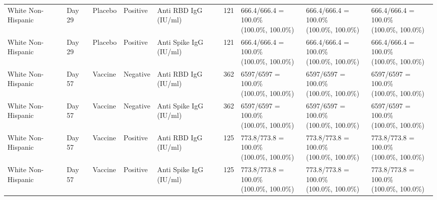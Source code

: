 \documentclass[]{book}
\theoremstyle{definition}
\theoremstyle{definition}
\theoremstyle{definition}
\newcommand{\1}{\mathbbm{1}}
\begin{document}
\begin{landscape}
\begin{ThreePartTable}
\begin{longtable}[t]{>{\raggedright\arraybackslash}p{2.7cm}llllllll}
\hspace{1em}White Non-Hispanic & Day 29 & Placebo & Positive & Anti RBD IgG (IU/ml) & 121 & \makecell[l]{666.4/666.4 = 100.0\%\\(100.0\%, 100.0\%)} & \makecell[l]{666.4/666.4 = 100.0\%\\(100.0\%, 100.0\%)} & \makecell[l]{666.4/666.4 = 100.0\%\\(100.0\%, 100.0\%)}\\
\hspace{1em}White Non-Hispanic & Day 29 & Placebo & Positive & Anti Spike IgG (IU/ml) & 121 & \makecell[l]{666.4/666.4 = 100.0\%\\(100.0\%, 100.0\%)} & \makecell[l]{666.4/666.4 = 100.0\%\\(100.0\%, 100.0\%)} & \makecell[l]{666.4/666.4 = 100.0\%\\(100.0\%, 100.0\%)}\\
\hspace{1em}White Non-Hispanic & Day 57 & Vaccine & Negative & Anti RBD IgG (IU/ml) & 362 & \makecell[l]{6597/6597 = 100.0\%\\(100.0\%, 100.0\%)} & \makecell[l]{6597/6597 = 100.0\%\\(100.0\%, 100.0\%)} & \makecell[l]{6597/6597 = 100.0\%\\(100.0\%, 100.0\%)}\\
\hspace{1em}White Non-Hispanic & Day 57 & Vaccine & Negative & Anti Spike IgG (IU/ml) & 362 & \makecell[l]{6597/6597 = 100.0\%\\(100.0\%, 100.0\%)} & \makecell[l]{6597/6597 = 100.0\%\\(100.0\%, 100.0\%)} & \makecell[l]{6597/6597 = 100.0\%\\(100.0\%, 100.0\%)}\\
\hspace{1em}White Non-Hispanic & Day 57 & Vaccine & Positive & Anti RBD IgG (IU/ml) & 125 & \makecell[l]{773.8/773.8 = 100.0\%\\(100.0\%, 100.0\%)} & \makecell[l]{773.8/773.8 = 100.0\%\\(100.0\%, 100.0\%)} & \makecell[l]{773.8/773.8 = 100.0\%\\(100.0\%, 100.0\%)}\\
\hspace{1em}White Non-Hispanic & Day 57 & Vaccine & Positive & Anti Spike IgG (IU/ml) & 125 & \makecell[l]{773.8/773.8 = 100.0\%\\(100.0\%, 100.0\%)} & \makecell[l]{773.8/773.8 = 100.0\%\\(100.0\%, 100.0\%)} & \makecell[l]{773.8/773.8 = 100.0\%\\(100.0\%, 100.0\%)}\\

\end{longtable}
\end{ThreePartTable}
\end{landscape}
\end{document}
